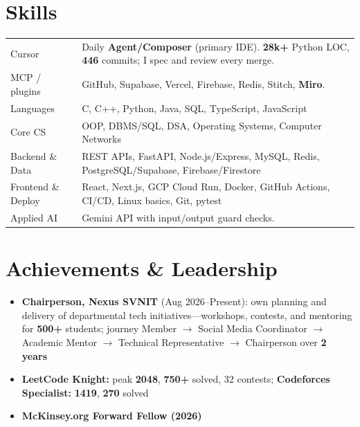 \documentclass[a4paper,10pt]{article}
\begin{document}
\section{Skills}
\noindent\small
{\renewcommand{\arraystretch}{1.28}%
\begin{tabularx}{\textwidth}{@{}K >{\raggedright\arraybackslash}X@{}}
Cursor & Daily \textbf{Agent/Composer} (primary IDE). \textbf{28k+} Python LOC, \textbf{446} commits; I spec and review every merge. \\
MCP / plugins & GitHub, Supabase, Vercel, Firebase, Redis, Stitch, \textbf{Miro}. \\
Languages & C, C++, Python, Java, SQL, TypeScript, JavaScript \\
Core CS & OOP, DBMS/SQL, DSA, Operating Systems, Computer Networks \\
Backend \& Data & REST APIs, FastAPI, Node.js/Express, MySQL, Redis, PostgreSQL/Supabase, Firebase/Firestore \\
Frontend \& Deploy & React, Next.js, GCP Cloud Run, Docker, GitHub Actions, CI/CD, Linux basics, Git, pytest \\
Applied AI & Gemini API with input/output guard checks. \\
\end{tabularx}}

\section{Achievements \& Leadership}
\begin{itemize}
  \item \textbf{Chairperson, Nexus SVNIT} (Aug 2026--Present): own planning and delivery of departmental tech initiatives---workshops, contests, and mentoring for \textbf{500+} students; journey Member $\to$ Social Media Coordinator $\to$ Academic Mentor $\to$ Technical Representative $\to$ Chairperson over \textbf{2 years}
  \item \textbf{LeetCode Knight:} peak \textbf{2048}, \textbf{750+} solved, 32 contests; \textbf{Codeforces Specialist:} \textbf{1419}, \textbf{270} solved
  \item \textbf{McKinsey.org Forward Fellow (2026)}
\end{itemize}
\end{document}
